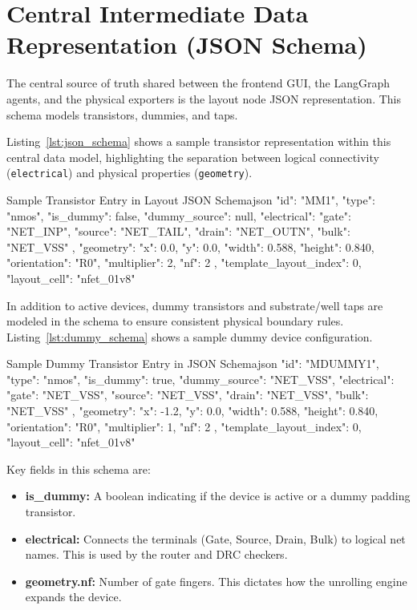 \section[JSON Schema]{Central Intermediate Data Representation (JSON Schema)}
\label{sec:data_model}

The central source of truth shared between the frontend GUI, the LangGraph agents, and the physical exporters is the layout node JSON representation. This schema models transistors, dummies, and taps.

Listing~\ref{lst:json_schema} shows a sample transistor representation within this central data model, highlighting the separation between logical connectivity (\texttt{electrical}) and physical properties (\texttt{geometry}).

\begin{thesiscode}{Sample Transistor Entry in Layout JSON Schema\label{lst:json_schema}}{json}
{
  "id": "MM1",
  "type": "nmos",
  "is_dummy": false,
  "dummy_source": null,
  "electrical": {
    "gate": "NET_INP",
    "source": "NET_TAIL",
    "drain": "NET_OUTN",
    "bulk": "NET_VSS"
  },
  "geometry": {
    "x": 0.0,
    "y": 0.0,
    "width": 0.588,
    "height": 0.840,
    "orientation": "R0",
    "multiplier": 2,
    "nf": 2
  },
  "template_layout_index": 0,
  "layout_cell": "nfet_01v8"
}
\end{thesiscode}

\vspace{0.5cm}
\newpage
In addition to active devices, dummy transistors and substrate/well taps are modeled in the schema to ensure consistent physical boundary rules. Listing~\ref{lst:dummy_schema} shows a sample dummy device configuration.

\begin{thesiscode}{Sample Dummy Transistor Entry in JSON Schema\label{lst:dummy_schema}}{json}
{
  "id": "MDUMMY1",
  "type": "nmos",
  "is_dummy": true,
  "dummy_source": "NET_VSS",
  "electrical": {
    "gate": "NET_VSS",
    "source": "NET_VSS",
    "drain": "NET_VSS",
    "bulk": "NET_VSS"
  },
  "geometry": {
    "x": -1.2,
    "y": 0.0,
    "width": 0.588,
    "height": 0.840,
    "orientation": "R0",
    "multiplier": 1,
    "nf": 2
  },
  "template_layout_index": 0,
  "layout_cell": "nfet_01v8"
}
\end{thesiscode}

\vspace{0.5cm}
Key fields in this schema are:
\begin{itemize}
    \item \textbf{is\_dummy:} A boolean indicating if the device is active or a dummy padding transistor.
    \item \textbf{electrical:} Connects the terminals (Gate, Source, Drain, Bulk) to logical net names. This is used by the router and DRC checkers.
    \item \textbf{geometry.nf:} Number of gate fingers. This dictates how the unrolling engine expands the device.
\end{itemize}

